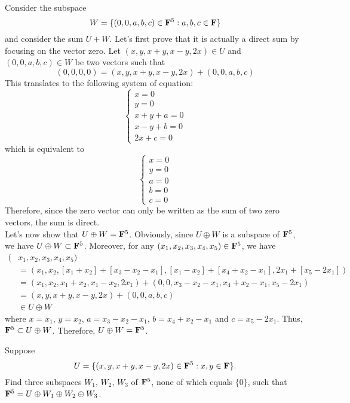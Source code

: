 \begin{solution}
    \\ Consider the subspace
    $$W = \{(0, 0, a, b, c) \in \mathbf{F}^5 : a,b,c \in \mathbf{F} \}$$
    and consider the sum $U + W$. Let's first prove that it is actually a direct sum by focusing on the vector zero. Let $(x, y, x+y, x-y, 2x) \in U$ and $(0, 0, a, b, c) \in W$ be two vectors such that
    $$(0,0,0,0) = (x, y, x+y, x-y, 2x) + (0, 0, a, b, c)$$
    This translates to the following system of equation:
    $$\begin{cases}
        x=0 \\ y = 0\\x + y + a = 0 \\ x - y + b = 0 \\ 2x + c = 0
    \end{cases}$$
    which is equivalent to
    $$\begin{cases}
        x=0 \\ y=0 \\ a=0 \\ b=0 \\ c=0
    \end{cases}$$
    Therefore, since the zero vector can only be written as the sum of two zero vectors, the sum is direct. \\
    Let's now show that $U \oplus W = \mathbf{F}^5$. Obviously, since $U \oplus W$ is a subspace of $\mathbf{F}^5$, we have $U \oplus W \subset \mathbf{F}^5$. Moreover, for any $(x_1, x_2, x_3, x_4, x_5) \in \mathbf{F}^5$, we have
    \begin{align*}
        (&x_1, x_2, x_3, x_4, x_5)\\
        &= (x_1, x_2, [x_1 + x_2] + [x_3 - x_2 - x_1], [x_1 - x_2] + [x_4 + x_2 - x_1], 2x_1 + [x_5 - 2x_1]) \\
        &= (x_1, x_2, x_1+x_2, x_1 - x_2,2x_1) + (0,0,x_3 - x_2 - x_1, x_4 + x_2 - x_1, x_5 - 2x_1) \\
        &= (x,y,x+y,x-y, 2x) + (0,0,a,b,c) \\
        &\in U \oplus W
    \end{align*}
    where $x = x_1$, $y=x_2$, $a = x_3 - x_2 - x_1$, $b = x_4 + x_2 - x_1$ and $c = x_5 - 2x_1$. Thus, $\mathbf{F}^5 \subset U \oplus W$. Therefore, $U \oplus W = \mathbf{F}^5$. \\
\end{solution}

\begin{exercise}
    Suppose 
    $$U = \{(x, y, x+y, x-y, 2x) \in \mathbf{F}^5 : x,y \in \mathbf{F} \}.$$
    Find three subspaces $W_1$, $W_2$, $W_3$ of $\mathbf{F}^5$, none of which equals $\{0\}$, such that $\mathbf{F}^5 = U \oplus W_1 \oplus W_2 \oplus W_3$. \\
\end{exercise}

